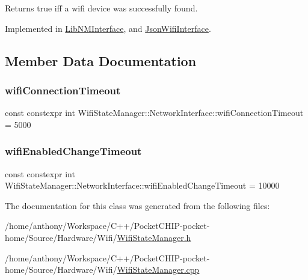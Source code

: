 \begin{DoxyReturn}{Returns}
true iff a wifi device was successfully found. 
\end{DoxyReturn}


Implemented in \mbox{\hyperlink{classLibNMInterface_a78f5de282c47c78e87ffa21ea542475b}{Lib\+N\+M\+Interface}}, and \mbox{\hyperlink{classJsonWifiInterface_ae8f08870a543214555113d103e9fc136}{Json\+Wifi\+Interface}}.



\subsection{Member Data Documentation}
\mbox{\label{classWifiStateManager_1_1NetworkInterface_a35701ae2339bcbbeeee25518ee990a41}} 
\subsubsection{\texorpdfstring{wifi\+Connection\+Timeout}{wifiConnectionTimeout}}
{\footnotesize\ttfamily const constexpr int Wifi\+State\+Manager\+::\+Network\+Interface\+::wifi\+Connection\+Timeout = 5000\hspace{0.3cm}{\ttfamily [static]}}

\mbox{\label{classWifiStateManager_1_1NetworkInterface_acb18c91fe47da4e1bd3e9011e46076c9}} 
\subsubsection{\texorpdfstring{wifi\+Enabled\+Change\+Timeout}{wifiEnabledChangeTimeout}}
{\footnotesize\ttfamily const constexpr int Wifi\+State\+Manager\+::\+Network\+Interface\+::wifi\+Enabled\+Change\+Timeout = 10000\hspace{0.3cm}{\ttfamily [static]}}



The documentation for this class was generated from the following files\+:\begin{DoxyCompactItemize}
\item 
/home/anthony/\+Workspace/\+C++/\+Pocket\+C\+H\+I\+P-\/pocket-\/home/\+Source/\+Hardware/\+Wifi/\mbox{\hyperlink{WifiStateManager_8h}{Wifi\+State\+Manager.\+h}}\item 
/home/anthony/\+Workspace/\+C++/\+Pocket\+C\+H\+I\+P-\/pocket-\/home/\+Source/\+Hardware/\+Wifi/\mbox{\hyperlink{WifiStateManager_8cpp}{Wifi\+State\+Manager.\+cpp}}\end{DoxyCompactItemize}
